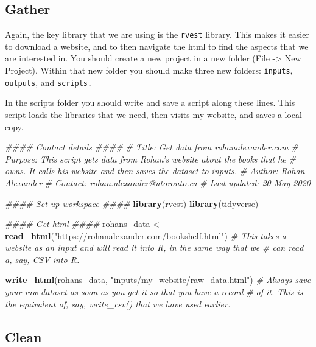 \documentclass[
]{book}
\newenvironment{Shaded}{\begin{snugshade}}{\end{snugshade}}
\newcommand{\CommentTok}[1]{\textcolor[rgb]{0.56,0.35,0.01}{\textit{#1}}}
\newcommand{\KeywordTok}[1]{\textcolor[rgb]{0.13,0.29,0.53}{\textbf{#1}}}
\newcommand{\NormalTok}[1]{#1}
\newcommand{\StringTok}[1]{\textcolor[rgb]{0.31,0.60,0.02}{#1}}
\begin{document}
\hypertarget{gather}{%
\subsection{Gather}\label{gather}}

Again, the key library that we are using is the \texttt{rvest} library. This makes it easier to download a website, and to then navigate the html to find the aspects that we are interested in. You should create a new project in a new folder (File -\textgreater{} New Project). Within that new folder you should make three new folders: \texttt{inputs}, \texttt{outputs}, and \texttt{scripts.}

In the scripts folder you should write and save a script along these lines. This script loads the libraries that we need, then visits my website, and saves a local copy.

\begin{Shaded}
\begin{Highlighting}[]
\CommentTok{#### Contact details ####}
\CommentTok{# Title: Get data from rohanalexander.com}
\CommentTok{# Purpose: This script gets data from Rohan's website about the books that he }
\CommentTok{# owns. It calls his website and then saves the dataset to inputs.}
\CommentTok{# Author: Rohan Alexander}
\CommentTok{# Contact: rohan.alexander@utoronto.ca}
\CommentTok{# Last updated: 20 May 2020}


\CommentTok{#### Set up workspace ####}
\KeywordTok{library}\NormalTok{(rvest)}
\KeywordTok{library}\NormalTok{(tidyverse)}


\CommentTok{#### Get html ####}
\NormalTok{rohans_data <-}\StringTok{ }\KeywordTok{read_html}\NormalTok{(}\StringTok{"https://rohanalexander.com/bookshelf.html"}\NormalTok{)}
\CommentTok{# This takes a website as an input and will read it into R, in the same way that we }
\CommentTok{# can read a, say, CSV into R.}

\KeywordTok{write_html}\NormalTok{(rohans_data, }\StringTok{"inputs/my_website/raw_data.html"}\NormalTok{) }
\CommentTok{# Always save your raw dataset as soon as you get it so that you have a record }
\CommentTok{# of it. This is the equivalent of, say, write_csv() that we have used earlier.}
\end{Highlighting}
\end{Shaded}

\hypertarget{clean}{%
\subsection{Clean}\label{clean}}
\end{document}
